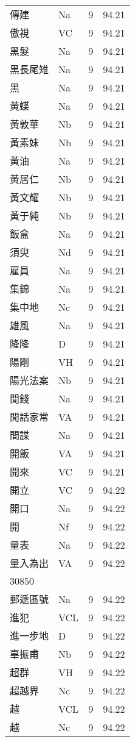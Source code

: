 \documentclass[twocolumn]{book}
\begin{document}
\begin{supertabular}{llrr}
傳建 & Na & 9 &  94.21\\
傲視 & VC & 9 &  94.21\\
黑髮 & Na & 9 &  94.21\\
黑長尾雉 & Na & 9 &  94.21\\
黑 & Na & 9 &  94.21\\
黃蝶 & Na & 9 &  94.21\\
黃敦華 & Nb & 9 &  94.21\\
黃素妹 & Nb & 9 &  94.21\\
黃油 & Na & 9 &  94.21\\
黃居仁 & Nb & 9 &  94.21\\
黃文耀 & Nb & 9 &  94.21\\
黃于純 & Nb & 9 &  94.21\\
飯盒 & Na & 9 &  94.21\\
須臾 & Nd & 9 &  94.21\\
雇員 & Na & 9 &  94.21\\
集錦 & Na & 9 &  94.21\\
集中地 & Nc & 9 &  94.21\\
雄風 & Na & 9 &  94.21\\
隆隆 & D & 9 &  94.21\\
陽剛 & VH & 9 &  94.21\\
陽光法案 & Nb & 9 &  94.21\\
閒錢 & Na & 9 &  94.21\\
閒話家常 & VA & 9 &  94.21\\
間諜 & Na & 9 &  94.21\\
開飯 & VA & 9 &  94.21\\
開來 & VC & 9 &  94.21\\
開立 & VC & 9 &  94.22\\
開口 & Na & 9 &  94.22\\
開 & Nf & 9 &  94.22\\
量表 & Na & 9 &  94.22\\
量入為出 & VA & 9 &  94.22\\
30850\\
郵遞區號 & Na & 9 &  94.22\\
進犯 & VCL & 9 &  94.22\\
進一步地 & D & 9 &  94.22\\
辜振甫 & Nb & 9 &  94.22\\
超群 & VH & 9 &  94.22\\
超越界 & Nc & 9 &  94.22\\
越 & VCL & 9 &  94.22\\
越 & Nc & 9 &  94.22\\

\end{supertabular}
\end{document}

